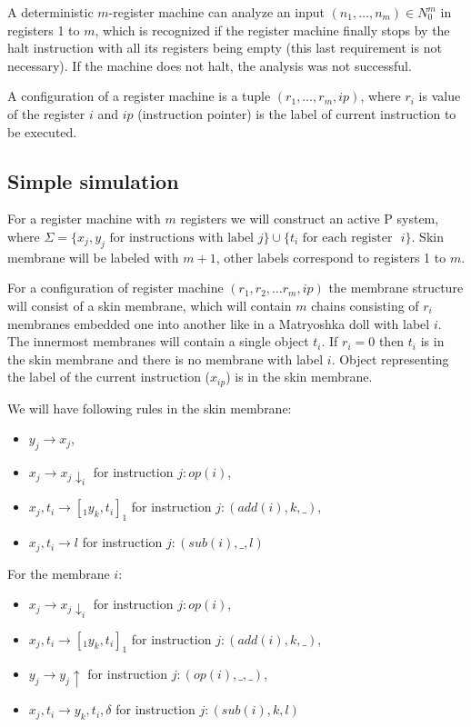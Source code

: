 \documentclass[llncs,submission,copyright,creativecommons]{../lib/lncs/llncs}
\begin{document}
A deterministic $m$-register machine can analyze an input $(n_1,\dots,n_m)\in N_0^m$ in registers 1 to $m$, which is recognized if the register machine finally stops by the halt instruction with all its registers being empty (this last requirement is not necessary). If the machine does not halt, the analysis was not successful.

A configuration of a register machine is a tuple $(r_1, \ldots, r_m, ip)$, where $r_i$ is value of the register $i$ and $ip$ (instruction pointer) is the label of current instruction to be executed.


\subsection{Simple simulation} %
\label{sub:simple_simulation}

For a register machine with $m$ registers we will construct an active P system, where $\Sigma = \{x_j, y_j \text{~for instructions with label~} j\}\cup\{t_i \text{~for each register ~}i\}$. Skin membrane will be labeled with $m+1$, other labels correspond to registers 1 to $m$.

For a configuration of register machine $(r_1, r_2, \ldots r_m, ip)$ the membrane structure will consist of a skin membrane, which will contain $m$ chains consisting of $r_i$ membranes embedded one into another like in a Matryoshka doll with label $i$. The innermost membranes will contain a single object $t_i$. If $r_i = 0$ then $t_i$ is in the skin membrane and there is no membrane with label $i$. Object representing the label of the current instruction ($x_{ip}$) is in the skin membrane.

We will have following rules in the skin membrane:
\begin{itemize}
  \item $y_j \rightarrow x_j$,
  \item $x_j \rightarrow x_j\downarrow_{i}$ for instruction $j: op(i)$,
  \item $x_j, t_i \rightarrow [_1 y_k, t_i ]_1$ for instruction $j: (add(i), k, \_)$,
  \item $x_j, t_i \rightarrow l$ for instruction $j: (sub(i), \_, l)$
\end{itemize}

For the membrane $i$:
\begin{itemize}
  \item $x_j \rightarrow x_j\downarrow_{i}$ for instruction $j: op(i)$,
  \item $x_j, t_i \rightarrow [_1 y_k, t_i ]_1$ for instruction $j: (add(i), k, \_)$,
  \item $y_j \rightarrow y_j\uparrow$ for instruction $j: (op(i), \_, \_)$,
  \item $x_j, t_i \rightarrow y_k, t_i, \delta$ for instruction $j: (sub(i), k, l)$
\end{itemize}
\end{document}
